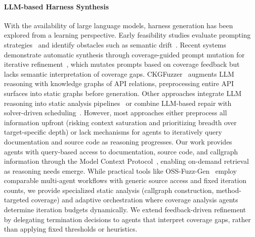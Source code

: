 \paragraph{LLM-based Harness Synthesis}
With the availability of large language models, harness generation has been explored from a learning perspective. Early feasibility studies evaluate prompting strategies~\cite{DBLP:conf/issta/ZhangZBLMXLSL24:HowEffectiveAreThey} and identify obstacles such as semantic drift~\cite{DBLP:conf/sigsoft/Jiang0MCZSWFWLZ24:WhenFuzzingMeetsLLMs}. Recent systems demonstrate automatic synthesis through coverage-guided prompt mutation for iterative refinement~\cite{DBLP:conf/ccs/LyuXCC24:PromptFuzz}, which mutates prompts based on coverage feedback but lacks semantic interpretation of coverage gaps. CKGFuzzer~\cite{DBLP:conf/icse/XuMZZCHLW25:CKGFuzzer} augments LLM reasoning with knowledge graphs of API relations, preprocessing entire API surfaces into static graphs before generation. Other approaches integrate LLM reasoning into static analysis pipelines~\cite{DBLP:journals/corr/abs-2505-03425:HGFuzzer} or combine LLM-based repair with solver-driven scheduling~\cite{DBLP:journals/corr/abs-2507-18289:Scheduzz}. However, most approaches either preprocess all information upfront (risking context saturation and prioritizing breadth over target-specific depth) or lack mechanisms for agents to iteratively query documentation and source code as reasoning progresses. Our work provides agents with query-based access to documentation, source code, and callgraph information through the Model Context Protocol~\cite{mcp}, enabling on-demand retrieval as reasoning needs emerge. While practical tools like OSS-Fuzz-Gen~\cite{oss-fuzz-gen} employ comparable multi-agent workflows with generic source access and fixed iteration counts, we provide specialized static analysis (callgraph construction, method-targeted coverage) and adaptive orchestration where coverage analysis agents determine iteration budgets dynamically. We extend feedback-driven refinement~\cite{DBLP:conf/ccs/LyuXCC24:PromptFuzz, DBLP:conf/uss/ZhangLZZZZXLL0H23:Rubick} by delegating termination decisions to agents that interpret coverage gaps, rather than applying fixed thresholds or heuristics.

